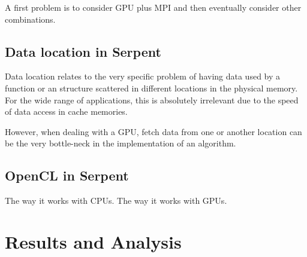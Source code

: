 \documentclass[twoside,a4paper,12pt,english,draft]{anstrans}
\renewcommand{\vec}[1]{\bm{#1}} %
\newcommand{\vd}{\bm{\cdot}} %
\newcommand{\grad}{\vec{\nabla}} %
\newcommand{\ud}{\mathop{}\!\mathrm{d}} %
\begin{document}
A first problem is to consider GPU plus MPI and then eventually consider other combinations.

\subsection{Data location in Serpent}

Data location relates to the very specific problem of having data used by a function or an
structure scattered in different locations in the physical memory. For the wide range of
applications, this is absolutely irrelevant due to the speed of data access in cache memories.

However, when dealing with a GPU, fetch data from one or another location can be the very
bottle-neck in the implementation of an algorithm.

\subsection{OpenCL in Serpent}

The way it works with CPUs.
The way it works with GPUs.

\iffalse
\begin{subequations} \label{eqs:fullTransport}
\begin{multline} \label{eq:fullTransportVol}
  \vec{\Omega}\vd \grad \psi(\vec{x}, \vec{\Omega})
  + \sigma(\vec{x}) \psi (\vec{x}, \vec{\Omega})
\\ =
  \frac{\sigma_s(\vec{x})}{4\pi} \int_{4\pi} \psi(\vec{x},\vec{\Omega}')
  \ud\Omega' + \frac{q(\vec{x})}{4\pi}
  \equiv \frac{1}{4\pi} Q(\vec{x}) \,,
\end{multline}
inside $\vec{x} \in V$, $\vec{\Omega} \in 4\pi$, with an incident boundary
condition
\begin{equation} \label{eq:fullTransportBndy}
  \psi(\vec{x}, \vec{\Omega}) = \psi^b(\vec{x}, \vec{\Omega}) \,,
 \quad \vec{x} \in \partial V, \ \vec{\Omega} \vd \vec{n} < 0\,.
\end{equation}
\end{subequations}
\fi

\section{Results and Analysis}
\end{document}
